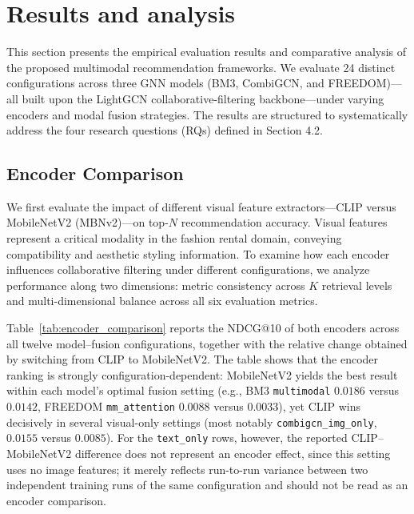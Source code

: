 \section{Results and analysis}

This section presents the empirical evaluation results and comparative analysis of the proposed multimodal recommendation frameworks. We evaluate 24 distinct configurations across three GNN models (BM3, CombiGCN, and FREEDOM)---all built upon the LightGCN collaborative-filtering backbone---under varying encoders and modal fusion strategies. The results are structured to systematically address the four research questions (RQs) defined in Section 4.2.

\subsection{Encoder Comparison}

We first evaluate the impact of different visual feature extractors---CLIP versus MobileNetV2 (MBNv2)---on top-$N$ recommendation accuracy. Visual features represent a critical modality in the fashion rental domain, conveying compatibility and aesthetic styling information. To examine how each encoder influences collaborative filtering under different configurations, we analyze performance along two dimensions: metric consistency across $K$ retrieval levels and multi-dimensional balance across all six evaluation metrics.

Table~\ref{tab:encoder_comparison} reports the NDCG@10 of both encoders across all twelve model--fusion configurations, together with the relative change obtained by switching from CLIP to MobileNetV2. The table shows that the encoder ranking is strongly configuration-dependent: MobileNetV2 yields the best result within each model's optimal fusion setting (e.g., BM3 \texttt{multimodal} $0.0186$ versus $0.0142$, FREEDOM \texttt{mm\_attention} $0.0088$ versus $0.0033$), yet CLIP wins decisively in several visual-only settings (most notably \texttt{combigcn\_img\_only}, $0.0155$ versus $0.0085$). For the \texttt{text\_only} rows, however, the reported CLIP--MobileNetV2 difference does not represent an encoder effect, since this setting uses no image features; it merely reflects run-to-run variance between two independent training runs of the same configuration and should not be read as an encoder comparison.

